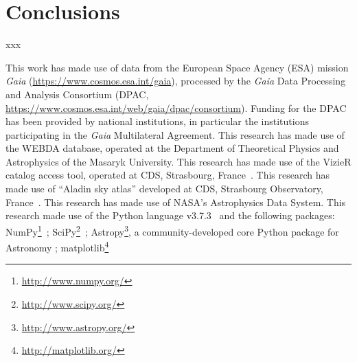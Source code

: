 \documentclass{aa}
\begin{document}

\section{Conclusions}

xxx

\begin{acknowledgements}
This work has made use of data from the European Space Agency (ESA) mission
{\it Gaia} (\url{https://www.cosmos.esa.int/gaia}), processed by the {\it Gaia}
Data Processing and Analysis Consortium (DPAC,
\url{https://www.cosmos.esa.int/web/gaia/dpac/consortium}). Funding for the DPAC
has been provided by national institutions, in particular the institutions
participating in the {\it Gaia} Multilateral Agreement.
%
This research has made use of the WEBDA database, operated at the Department of
Theoretical Physics and Astrophysics of the Masaryk University.
%
This research has made use of the VizieR catalog access tool, operated at CDS,
Strasbourg, France~\citep{Ochsenbein_2000}.
%
This research has made use of ``Aladin sky atlas'' developed at
CDS, Strasbourg Observatory, France~\citep{Bonnarel2000,Boch2014}.
%
This research has made use of NASA's Astrophysics Data System.
%
This research made use of the Python language v3.7.3~\citep{vanRossum_1995}
and the following packages:
NumPy\footnote{\url{http://www.numpy.org/}}~\citep{vanDerWalt_2011};
SciPy\footnote{\url{http://www.scipy.org/}}~\citep{Jones_2001};
Astropy\footnote{\url{http://www.astropy.org/}}, a community-developed core
Python package for Astronomy \citep{Astropy_2013};
matplotlib\footnote{\url{http://matplotlib.org/}}~\citep{hunter_2007}
\end{acknowledgements}







\end{document}
